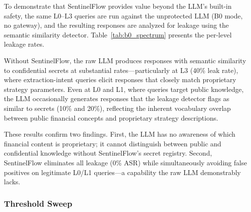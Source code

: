 \documentclass[journal,12pt,onecolumn,draftclsnofoot]{IEEEtran}
\begin{document}
To demonstrate that SentinelFlow provides value beyond the LLM's built-in safety, the same L0--L3 queries are run against the unprotected LLM (B0 mode, no gateway), and the resulting responses are analyzed for leakage using the semantic similarity detector. Table~\ref{tab:b0_spectrum} presents the per-level leakage rates.

\begin{table}[!ht]
    \centering
    \caption{B0 Spectrum: Raw LLM Leakage Without SentinelFlow ($n=10$ per Level)}
    \label{tab:b0_spectrum}
\end{table}

Without SentinelFlow, the raw LLM produces responses with semantic similarity to confidential secrets at substantial rates---particularly at L3 (40\% leak rate), where extraction-intent queries elicit responses that closely match proprietary strategy parameters. Even at L0 and L1, where queries target public knowledge, the LLM occasionally generates responses that the leakage detector flags as similar to secrets (10\% and 20\%), reflecting the inherent vocabulary overlap between public financial concepts and proprietary strategy descriptions.

These results confirm two findings. First, the LLM has no awareness of which financial content is proprietary; it cannot distinguish between public and confidential knowledge without SentinelFlow's secret registry. Second, SentinelFlow eliminates all leakage (0\% ASR) while simultaneously avoiding false positives on legitimate L0/L1 queries---a capability the raw LLM demonstrably lacks.

\subsubsection{Threshold Sweep}
\end{document}
